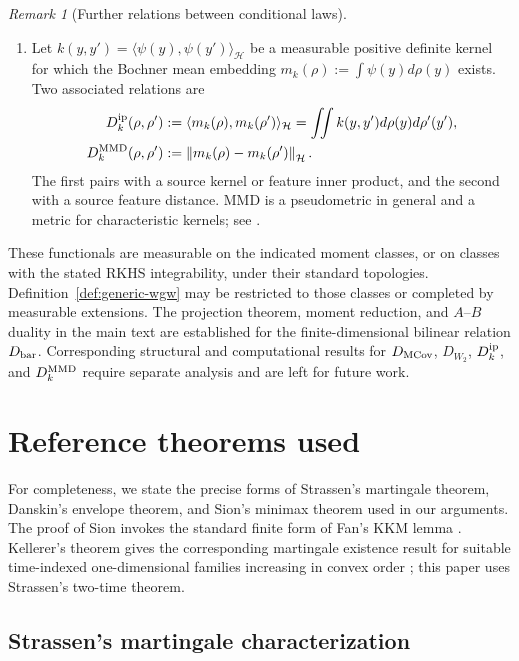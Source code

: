 \documentclass[11pt]{article}
\newcommand{\norm}[1]{\left\lVert #1\right\rVert}
\theoremstyle{plain}
\theoremstyle{definition}
\theoremstyle{remark}
\newtheorem{remark}[theorem]{Remark}
\begin{document}
\begin{remark}[Further relations between conditional laws]
\begin{enumerate}[label=(\roman*),leftmargin=2em]
\item Let $k(y,y')=\langle\psi(y),\psi(y')\rangle_{\mathcal H}$ be a measurable
positive definite kernel for which the Bochner mean embedding
$m_k(\rho):=\int\psi(y)d\rho(y)$ exists. Two associated relations are
\[
 \begin{aligned}
 D_k^{\rm ip}(\rho,\rho')
   &:=\langle m_k(\rho),m_k(\rho')\rangle_{\mathcal H}
     =\iint k(y,y')d\rho(y)d\rho'(y'),\\
 D_k^{\rm MMD}(\rho,\rho')
   &:=\norm{m_k(\rho)-m_k(\rho')}_{\mathcal H}.
 \end{aligned}
\]
The first pairs with a source kernel or feature inner product, and the second with a
source feature distance. MMD is a pseudometric in general and a metric for
characteristic kernels; see \cite{MuandetEtAl,ParkMuandet}.
\end{enumerate}

These functionals are measurable on the indicated moment classes, or on classes with
the stated RKHS integrability, under their standard topologies.
Definition~\ref{def:generic-wgw} may be restricted to those classes or completed by
measurable extensions. The projection theorem, moment reduction, and $A$--$B$
duality in the main text are established for the finite-dimensional bilinear
relation $D_{\rm bar}$. Corresponding structural and computational results for
$D_{\rm MCov}$, $D_{W_2}$, $D_k^{\rm ip}$, and $D_k^{\rm MMD}$ require separate
analysis and are left for future work.
\end{remark}

\section{Reference theorems used}\label{app:reference-theorems}

For completeness, we state the precise forms of Strassen's martingale theorem,
Danskin's envelope theorem, and Sion's minimax theorem used in our arguments. The
proof of Sion invokes
the standard finite form of Fan's KKM lemma \cite{FanKKM}. Kellerer's theorem gives
the corresponding martingale existence result for suitable time-indexed
one-dimensional families increasing in convex order \cite{Kellerer}; this paper uses
Strassen's two-time theorem.

\subsection{Strassen's martingale characterization}\label{subsec:strassen}
\end{document}
